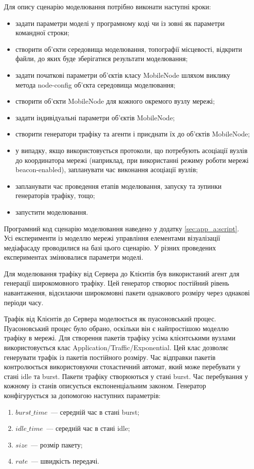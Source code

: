 \documentclass[a4paper,ukrainian,utf8,nocolumnsxix,nocolumnxxxii,nocolumnxxxi,floatsection,equationsection]{eskdtext}
\newcommand{\bem}[0]{beacon-enabled\xspace}
\begin{document}
Для опису сценарію моделювання потрібно виконати наступні кроки:
\begin{itemize}
	\item задати параметри моделі у програмному коді чи із зовні як параметри командної строки;
	\item створити об'єкти середовища моделювання, топографії місцевості, відкрити файли, до яких буде зберігатися результати  моделювання;
	\item задати початкові параметри об'єктів класу MobileNode шляхом виклику метода node-config об'єкта середовища моделювання;
	\item створити об'єкти MobileNode для кожного окремого вузлу мережі;
	\item задати індивідуальні параметри об'єктів MobileNode;
	\item створити генератори трафіку та агенти і приєднати їх до об'єктів MobileNode;
	\item у випадку, якщо використовується протоколи, що потребують асоціації вузлів до координатора мережі (наприклад, при використанні режиму роботи мережі \bem), запланувати час виконання асоціації вузлів;
	\item запланувати час проведення етапів моделювання, запуску та зупинки генераторів трафіку, тощо;
	\item запустити моделювання.
\end{itemize}

Програмний код сценарію моделювання наведено у додатку \ref{sec:app_a:script}. Усі експерименти із моделлю мережі управління елементами візуалізації медіафасаду проводилися на базі цього сценарію. У різних проведених експериментах змінювалися параметри моделі.

Для моделювання трафіку від Сервера до Клієнтів був використаний агент для генерації широкомовного трафіку. Цей генератор створює постійний рівень навантаження, відсилаючи широкомовні пакети однакового розміру через однакові періоди часу.

Трафік від Клієнтів до Сервера моделюється як пуасоновський процес. Пуасоновський процес було обрано, оскільки він є найпростішою моделлю трафіку в мережі. Для створення пакетів трафіку усіма клієнтськими вузлами використовується клас Application/Traffic/Exponential. Цей клас дозволяє генерувати трафік із пакетів постійного розміру. Час відправки пакетів контролюється використовуючи стохастичний автомат, який може перебувати у стані idle та burst. Пакети трафіку створюються у стані burst. Час перебування у кожному із станів описується експоненціальним законом. Генератор конфігурується за допомогою наступних параметрів: 
\begin{enumerate}
	\item $burst\_time$~--- середній час в стані burst;
	\item $idle\_time$~--- середній час в стані idle;
	\item $size$~--- розмір пакету;
	\item $rate$~--- швидкість передачі.
\end{enumerate}
\end{document}
